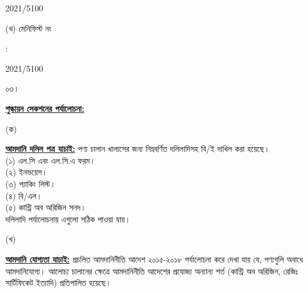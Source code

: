 \documentclass[12pt]{article}
\newcommand{\rotno}{2021/5100}
\newcommand{\menifest}{2021/5100}
\begin{document}
\begin{minipage}[t]{0.50\linewidth}
{\rotno}
\\
\end{minipage}
\begin{minipage}[t]{0.05\linewidth}
\hspace*{1em}
\end{minipage}
\begin{minipage}[t]{0.45\linewidth}
(থ) মেনিফিস্ট নং
\end{minipage}
\begin{minipage}[t]{0.02\linewidth}
:
\end{minipage}
\begin{minipage}[t]{0.50\linewidth}
{\menifest}
\\
\end{minipage}
\normalsize
\begin{minipage}[t]{0.05\linewidth}
০৩।
\end{minipage}
\begin{minipage}[t]{0.95\linewidth}
\underline{\textbf{শুল্কায়ন সেকশনের পর্যালোচনা:}}
\end{minipage}
\begin{minipage}[t]{0.05\linewidth}
\hspace{1em}
\end{minipage}
\begin{minipage}[t]{0.05\linewidth}
(ক)
\end{minipage}
\begin{minipage}[t]{0.90\linewidth}
\underline{\textbf{আমদানি দলিল পত্র যাচাই:}}
পণ্য চালান খালাসের জন্য নিম্নবর্ণিত দলিলাদিসহ বি/ই দাখিল করা
হয়েছে।
\\
(১) এল.সি এবং এল.সি.এ ফরম।
\\
(২) ইনভয়েস।
\\
(৩) প্যাকিং লিস্ট।
\\
(৪) বি/এল।
\\
(৫) কান্ট্রি অব অরিজিন সনদ।
\\
দলিলাদি পর্যালোচনায় এগুলো
সঠিক পাওয়া যায়।
\\
\end{minipage}
\begin{minipage}[t]{0.05\linewidth}
\hspace{1em}
\end{minipage}
\begin{minipage}[t]{0.05\linewidth}
(খ)
\end{minipage}
\begin{minipage}[t]{0.90\linewidth}
\underline{\textbf{আমদানি যোগ্যতা যাচাই:}}
প্রচলিত আমদানিনীতি আদেশ ২০১৫-২০১৮  পর্যালোচনা করে দেখা যায় যে, পণ্যগুলি অবাধে আমদানিযোগ্য।
আলোচ্য চালানের ক্ষেত্রে আমদানিনীতি আদেশের প্রযোজ্য অন্যান্য শর্ত (কান্ট্রি অব অরিজিন, রেজিঃ
সার্টিফিকেট ইত্যাদি) প্রতিপালিত হয়েছে।
\\
\end{minipage}
\end{document}
